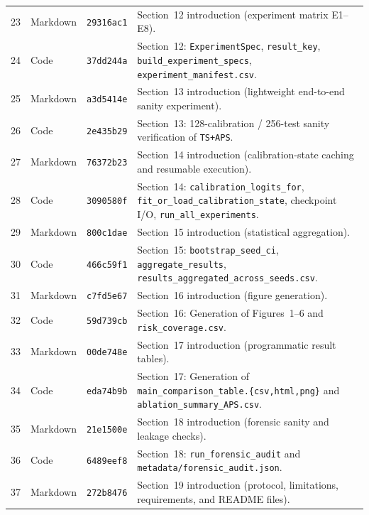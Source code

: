 \documentclass[11pt,a4paper]{article}
\begin{document}
{\begin{longtable}{r l l P{0.64\textwidth}}
23 & Markdown & \texttt{29316ac1} & Section~12 introduction (experiment matrix E1--E8). \\
24 & Code & \texttt{37dd244a} & Section~12: \texttt{ExperimentSpec}, \texttt{result\_\allowbreak{}key}, \texttt{build\_\allowbreak{}experiment\_\allowbreak{}specs}, \texttt{experiment\_\allowbreak{}manifest.csv}. \\
25 & Markdown & \texttt{a3d5414e} & Section~13 introduction (lightweight end-to-end sanity experiment). \\
26 & Code & \texttt{2e435b29} & Section~13: 128-calibration / 256-test sanity verification of \texttt{TS+APS}. \\
27 & Markdown & \texttt{76372b23} & Section~14 introduction (calibration-state caching and resumable execution). \\
28 & Code & \texttt{3090580f} & Section~14: \texttt{calibration\_\allowbreak{}logits\_\allowbreak{}for}, \texttt{fit\_\allowbreak{}or\_\allowbreak{}load\_\allowbreak{}calibration\_\allowbreak{}state}, checkpoint I/O, \texttt{run\_\allowbreak{}all\_\allowbreak{}experiments}. \\
29 & Markdown & \texttt{800c1dae} & Section~15 introduction (statistical aggregation). \\
30 & Code & \texttt{466c59f1} & Section~15: \texttt{bootstrap\_\allowbreak{}seed\_\allowbreak{}ci}, \texttt{aggregate\_\allowbreak{}results}, \texttt{results\_\allowbreak{}aggregated\_\allowbreak{}across\_\allowbreak{}seeds.csv}. \\
31 & Markdown & \texttt{c7fd5e67} & Section~16 introduction (figure generation). \\
32 & Code & \texttt{59d739cb} & Section~16: Generation of Figures~1--6 and \texttt{risk\_\allowbreak{}coverage.csv}. \\
33 & Markdown & \texttt{00de748e} & Section~17 introduction (programmatic result tables). \\
34 & Code & \texttt{eda74b9b} & Section~17: Generation of \texttt{main\_comparison\_table.\{csv,html,png\}} and \texttt{ablation\_\allowbreak{}summary\_\allowbreak{}APS.csv}. \\
35 & Markdown & \texttt{21e1500e} & Section~18 introduction (forensic sanity and leakage checks). \\
36 & Code & \texttt{6489eef8} & Section~18: \texttt{run\_\allowbreak{}forensic\_\allowbreak{}audit} and \texttt{metadata/\allowbreak{}forensic\_\allowbreak{}audit.json}. \\
37 & Markdown & \texttt{272b8476} & Section~19 introduction (protocol, limitations, requirements, and README files). \\

\end{longtable}}
\end{document}
